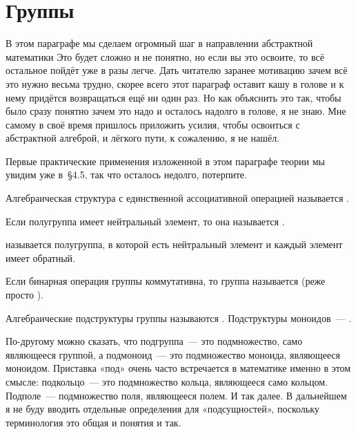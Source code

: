 \section{Группы}

В этом параграфе мы сделаем огромный шаг в направлении абстрактной математики Это будет сложно и не понятно, но если вы это освоите, то всё остальное пойдёт уже в разы легче. Дать читателю заранее мотивацию зачем всё это нужно весьма трудно, скорее всего этот параграф оставит кашу в голове и к нему придётся возвращаться ещё ни один раз. Но как объяснить это так, чтобы было сразу понятно зачем это надо и осталось надолго в голове, я не знаю. Мне самому в своё время пришлось приложить усилия, чтобы освоиться с абстрактной алгеброй, и лёгкого пути, к сожалению, я не нашёл.

Первые практические применения изложенной в этом параграфе теории мы увидим уже в~\S4.5, так что осталось недолго, потерпите.

\begin{definition}
	Алгебраическая структура с единственной ассоциативной операцией называется .
\end{definition}

\begin{definition}
	Если полугруппа имеет нейтральный элемент, то она называется .
\end{definition}

\begin{definition}
	 называется полугруппа, в которой есть нейтральный элемент и каждый элемент имеет обратный.
\end{definition}

\begin{definition}
	Если бинарная операция группы коммутативна, то группа называется  (реже просто ).
\end{definition}

\begin{definition}
	Алгебраические подструктуры группы называются . Подструктуры моноидов~— .
\end{definition}

По-другому можно сказать, что подгруппа~— это подмножество, само являющееся группой, а подмоноид~— это подмножество моноида, являющееся моноидом. Приставка «под» очень часто встречается в математике именно в этом смысле: подкольцо~— это подмножество кольца, являющееся само кольцом. Подполе~— подмножество поля, являющееся полем. И так далее. В дальнейшем я не буду вводить отдельные определения для «подсущностей», поскольку терминология это общая и понятия и так.

